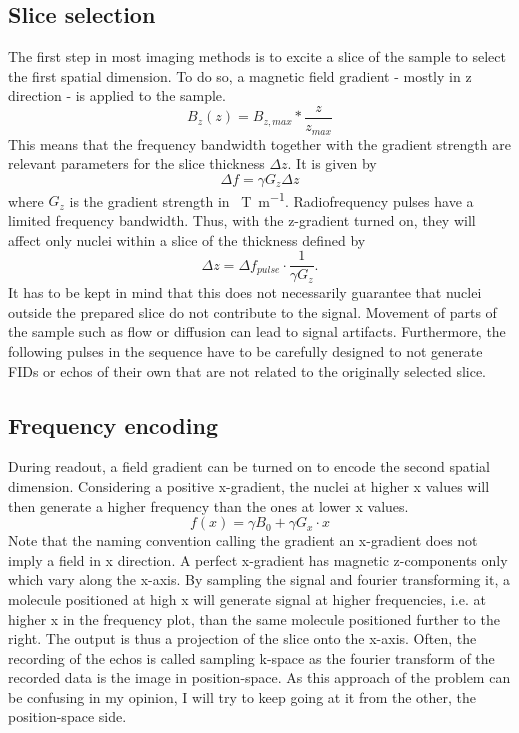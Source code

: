         \subsection{Slice selection}
            The first step in most imaging methods is to excite a slice of the sample to select the first spatial dimension. To do so, a magnetic field gradient - mostly in z direction - is applied to the sample. 
            \begin{equation}
                B_z(z) = B_{z,max} * \frac{z}{z_{max}}
            \end{equation}
            This means that the frequency bandwidth together with the gradient strength are relevant parameters for the slice thickness $\Delta z$. It is given by 
            \begin{equation}
                \Delta f = \gamma G_z \Delta z
            \end{equation}
            where $G_z$ is the gradient strength in \SI{}{\tesla\per\meter}.
            Radiofrequency pulses have a limited frequency bandwidth. Thus, with the z-gradient turned on, they will affect only nuclei within a slice of the thickness defined by
            \begin{equation}
                \Delta z = \Delta f_{pulse} \cdot \frac{1}{\gamma G_z}.
            \end{equation}
             It has to be kept in mind that this does not necessarily guarantee that nuclei outside the prepared slice do not contribute to the signal. Movement of parts of the sample such as flow or diffusion can lead to signal artifacts. Furthermore, the following pulses in the sequence have to be carefully designed to not generate FIDs or echos of their own that are not related to the originally selected slice.
        \subsection{Frequency encoding}
            During readout, a field gradient can be turned on to encode the second spatial dimension. Considering a positive x-gradient, the nuclei at higher x values will then generate a higher frequency than the ones at lower x values.
            \begin{equation}
                f(x) = \gamma B_0 + \gamma G_x \cdot x
            \end{equation}
            Note that the naming convention calling the gradient an x-gradient does not imply a field in x direction. A perfect x-gradient has magnetic z-components only which vary along the x-axis. By sampling the signal and fourier transforming it, a molecule positioned at high x will generate signal at higher frequencies, i.e. at higher x in the frequency plot, than the same molecule positioned further to the right. The output is thus a projection of the slice onto the x-axis.
            Often, the recording of the echos is called sampling k-space as the fourier transform of the recorded data is the image in position-space. As this approach of the problem can be confusing in my opinion, I will try to keep going at it from the other, the position-space side.
